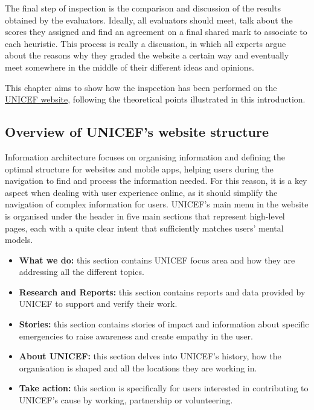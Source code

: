 The final step of inspection is the comparison and discussion of the results obtained by the evaluators. Ideally, all evaluators should meet, talk about the scores they assigned and find an agreement on a final shared mark to associate to each heuristic. This process is really a discussion, in which all experts argue about the reasons why they graded the website a certain way and eventually meet somewhere in the middle of their different ideas and opinions.

This chapter aims to show how the inspection has been performed on the \href{https://www.unicef.org/}{UNICEF website}, following the theoretical points illustrated in this introduction.
\clearpage

\subsection{Overview of UNICEF's website structure}

Information architecture focuses on organising information and defining the optimal structure for websites and mobile apps, helping users during the navigation to find and process the information needed.
For this reason, it is a key aspect when dealing with user experience online, as it should simplify the navigation of complex information for users. 
UNICEF's main menu in the website is organised under the header in five main sections that represent high-level pages, each with a quite clear intent that sufficiently matches users’ mental models.

\begin{itemize}
    \item \textbf{What we do:} this section contains UNICEF focus area and how they are addressing all the different topics.
    \item \textbf{Research and Reports:} this section contains reports and data provided by UNICEF to support and verify their work.
    \item \textbf{Stories:} this section contains stories of impact and information about specific emergencies to raise awareness and create empathy in the user.
    \item \textbf{About UNICEF:} this section delves into UNICEF's history, how the organisation is shaped and all the locations they are working in.
    \item \textbf{Take action:} this section is specifically for users interested in contributing to UNICEF's cause by working, partnership or volunteering.
\end{itemize}

